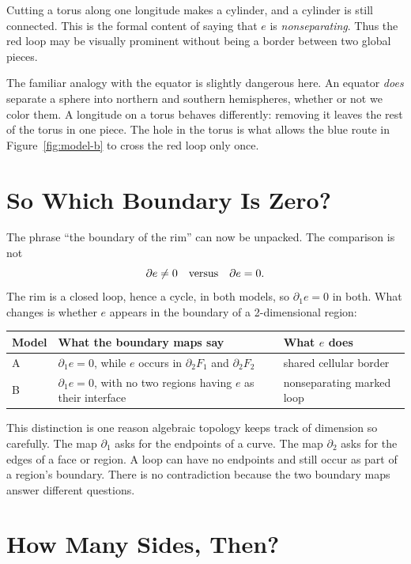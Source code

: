 \documentclass[12pt]{article}
\newcommand{\bd}{\partial}
\begin{document}
Cutting a torus along one longitude makes a cylinder, and a cylinder is still
connected.  This is the formal content of saying that \(e\) is
\emph{nonseparating}.  Thus the red loop may be visually prominent without
being a border between two global pieces.

The familiar analogy with the equator is slightly dangerous here.  An equator
\emph{does} separate a sphere into northern and southern hemispheres, whether
or not we color them.  A longitude on a torus behaves differently: removing it
leaves the rest of the torus in one piece.  The hole in the torus is what allows
the blue route in Figure~\ref{fig:model-b} to cross the red loop only once.

\section{So Which Boundary Is Zero?}

The phrase ``the boundary of the rim'' can now be unpacked.  The comparison is
not
\[
  \bd e\ne0 \quad\hbox{versus}\quad \bd e=0.
\]
The rim is a closed loop, hence a cycle, in both models, so \(\bd_1e=0\) in
both.  What changes is whether \(e\) appears in the boundary of a
2-dimensional region:

\begin{center}
\begin{tabular}{>{\raggedright\arraybackslash}p{.16\linewidth}
                >{\raggedright\arraybackslash}p{.47\linewidth}
                >{\raggedright\arraybackslash}p{.24\linewidth}}
\toprule
Model & What the boundary maps say & What \(e\) does \\
\midrule
A & \(\bd_1e=0\), while \(e\) occurs in \(\bd_2F_1\) and \(\bd_2F_2\)
  & shared cellular border \\
B & \(\bd_1e=0\), with no two regions having \(e\) as their interface
  & nonseparating marked loop \\
\bottomrule
\end{tabular}
\end{center}

This distinction is one reason algebraic topology keeps track of dimension so
carefully.  The map \(\bd_1\) asks for the endpoints of a curve.  The map
\(\bd_2\) asks for the edges of a face or region.  A loop can have no endpoints
and still occur as part of a region's boundary.  There is no contradiction
because the two boundary maps answer different questions.

\section{How Many Sides, Then?}
\end{document}
